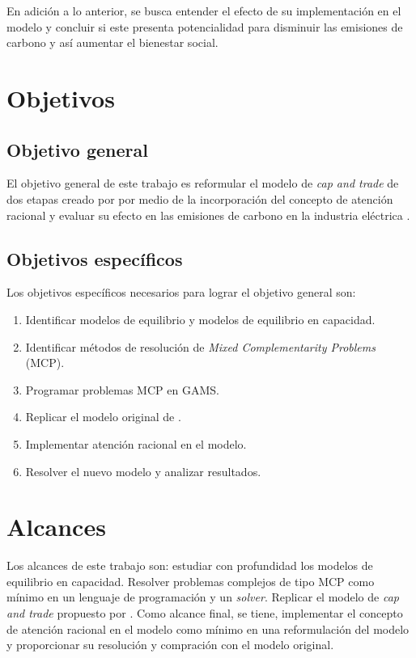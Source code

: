 En adición a lo anterior, se busca entender el efecto de su implementación en el modelo y concluir si este presenta potencialidad para disminuir las emisiones de carbono y así aumentar el bienestar social.


\section{Objetivos}
\subsection{Objetivo general}
El objetivo general de este trabajo es reformular el modelo de \textit{cap and trade} de dos etapas creado por  por medio de la incorporación del concepto de atención racional  y evaluar su efecto en las emisiones de carbono en la industria eléctrica . 

\subsection{Objetivos específicos}
Los objetivos específicos necesarios para lograr el objetivo general son:

\begin{enumerate}
\item Identificar modelos de equilibrio y modelos de equilibrio en capacidad.
\item Identificar métodos de resolución de \emph{Mixed Complementarity Problems} (MCP).
\item Programar problemas MCP en GAMS.
\item Replicar el modelo original de .
\item Implementar atención racional en el modelo.
\item Resolver el nuevo modelo y analizar resultados.
\end{enumerate}


\section{Alcances}

Los alcances de este trabajo son: estudiar con profundidad los modelos de equilibrio en capacidad. Resolver problemas complejos de tipo MCP como mínimo en un lenguaje de programación y un \textit{solver}. Replicar el modelo de \textit{cap and trade} propuesto por . Como alcance final, se tiene, implementar el concepto de atención racional en el modelo como mínimo en una reformulación del modelo y proporcionar su resolución y compración con el modelo original. 
\vspace{2.5mm}

